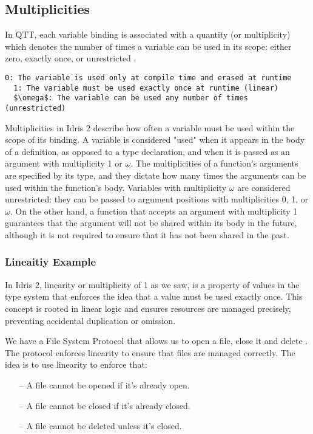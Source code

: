 \documentclass[]{rptuseminar}
\begin{document}
\subsection{Multiplicities}
In QTT,
each variable binding is associated with a quantity (or multiplicity) which denotes the number
of times a variable can be used in its scope: either zero, exactly once, or unrestricted \cite{atkey2018syntax}.

\begin{lstlisting}[mathescape=true]
  0: The variable is used only at compile time and erased at runtime
  1: The variable must be used exactly once at runtime (linear)
  $\omega$: The variable can be used any number of times (unrestricted)
\end{lstlisting}
\vspace{1em}  %

Multiplicities in Idris 2 describe how often a variable must be used within the scope of its binding. A variable is considered "used" when it appears in the body of a definition, as opposed to a type declaration, and when it is passed as an argument with multiplicity 1 or \(\omega\). The multiplicities of a function's arguments are specified by its type, and they dictate how many times the arguments can be used within the function's body. Variables with multiplicity \(\omega\) are considered unrestricted: they can be passed to argument positions with multiplicities 0, 1, or \(\omega\). On the other hand, a function that accepts an argument with multiplicity 1 guarantees that the argument will not be shared within its body in the future, although it is not required to ensure that it has not been shared in the past\cite{brady2021idris}.
\subsubsection{Lineaitiy Example} 
In Idris 2, linearity or multiplicity of 1 as we saw, is a property of values in the type system that enforces the idea that a value must be used exactly once. This concept is rooted in linear logic and ensures resources are managed precisely, preventing accidental duplication or omission. 

\vspace{1em}  %
We have a File System Protocol that allows us to open a file, close it and delete . The protocol enforces linearity to ensure that files are managed correctly.
The idea is to use linearity to enforce that:
\begin{itemize}
  \item[--] A file cannot be opened if it's already open.
  \item[--] A file cannot be closed if it's already closed.
  \item[--] A file cannot be deleted unless it's closed.
\end{itemize}
\end{document}
